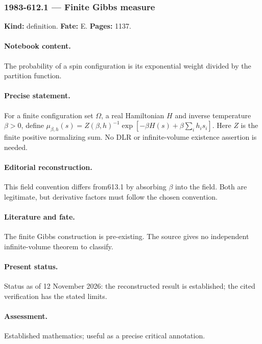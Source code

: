 \subsubsection{1983-612.1 --- Finite Gibbs measure}

\label{item:1983-612.1}

\noindent\textbf{Kind:} definition. \textbf{Fate:} E. \textbf{Pages:} 1137.\par

\paragraph{Notebook content.} The probability of a spin configuration is its exponential weight divided by the partition function.

\paragraph{Precise statement.} For a finite configuration set $\Omega$, a real Hamiltonian $H$ and inverse temperature $\beta>0$, define $\mu_{\beta,h}(s)=Z(\beta,h)^{-1}\exp[-\beta H(s)+\beta\sum_i h_i s_i]$. Here $Z$ is the finite positive normalizing sum. No DLR or infinite-volume existence assertion is needed.

\paragraph{Editorial reconstruction.} This field convention differs from613.1 by absorbing $\beta$ into the field. Both are legitimate, but derivative factors must follow the chosen convention.

\paragraph{Literature and fate.} The finite Gibbs construction is pre-existing. The source gives no independent infinite-volume theorem to classify.

\paragraph{Present status.} Status as of 12 November 2026: the reconstructed result is established; the cited verification has the stated limits.

\paragraph{Assessment.} Established mathematics; useful as a precise critical annotation.

